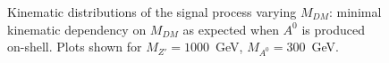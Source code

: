 \begin{figure}[h!]
	\centering
	\hfill
	\caption{Kinematic distributions of the signal process varying $M_{DM}$: minimal kinematic dependency on $M_{DM}$ as expected when $A^0$ is produced on-shell. Plots shown for $M_{Z'}=1000$~GeV, $M_{A^0}=300$~GeV.}
	\label{fig:DMH_mdm}
\end{figure}
 
